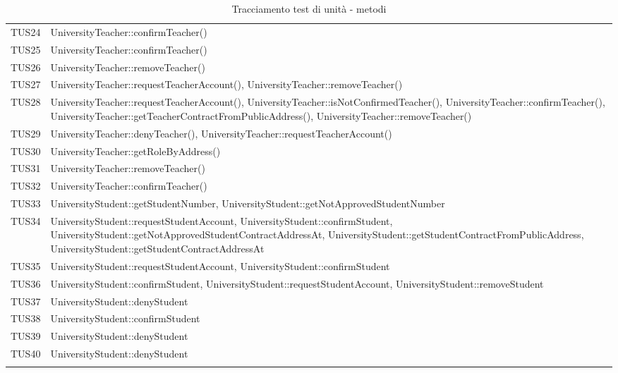 \documentclass[PianoDiQualifica.tex]{subfiles}
\begin{document}
\begin{longtable}[H]{P{5cm}P{9cm}}
	TUS24 & UniversityTeacher::confirmTeacher() \\
	TUS25 & UniversityTeacher::confirmTeacher() \\
	TUS26 & UniversityTeacher::removeTeacher() \\
	TUS27 & UniversityTeacher::requestTeacherAccount(), UniversityTeacher::removeTeacher() \\
	TUS28 & UniversityTeacher::requestTeacherAccount(), UniversityTeacher::isNotConfirmedTeacher(), UniversityTeacher::confirmTeacher(), UniversityTeacher::getTeacherContractFromPublicAddress(), UniversityTeacher::removeTeacher() \\
	TUS29 & UniversityTeacher::denyTeacher(), UniversityTeacher::requestTeacherAccount() \\
	TUS30 & UniversityTeacher::getRoleByAddress() \\
	TUS31 & UniversityTeacher::removeTeacher() \\
	TUS32 & UniversityTeacher::confirmTeacher() \\
	TUS33 & UniversityStudent::getStudentNumber, UniversityStudent::getNotApprovedStudentNumber \\
	TUS34 & UniversityStudent::requestStudentAccount, UniversityStudent::confirmStudent, UniversityStudent::getNotApprovedStudentContractAddressAt, UniversityStudent::getStudentContractFromPublicAddress, UniversityStudent::getStudentContractAddressAt
	\\
	TUS35 & UniversityStudent::requestStudentAccount, UniversityStudent::confirmStudent  \\
	TUS36 & UniversityStudent::confirmStudent, UniversityStudent::requestStudentAccount, UniversityStudent::removeStudent  \\
	TUS37 & UniversityStudent::denyStudent \\
	TUS38 & UniversityStudent::confirmStudent \\
	TUS39 & UniversityStudent::denyStudent \\
	TUS40 & UniversityStudent::denyStudent \\
	\hiderowcolors
	\caption{Tracciamento test di unità - metodi}
\end{longtable}
	
\end{document}

